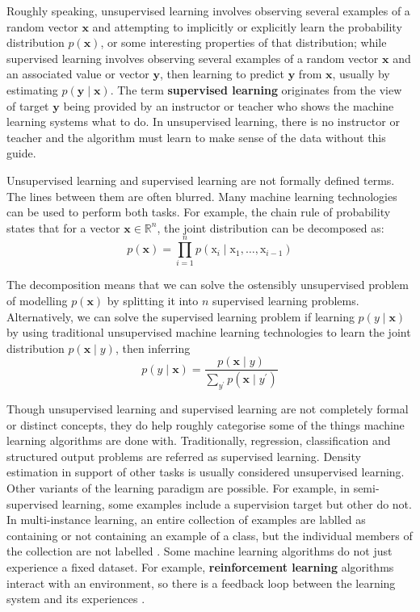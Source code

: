 Roughly speaking, unsupervised learning involves observing several examples of
a random vector $\mathbf{x}$ and attempting to implicitly or explicitly learn
the probability distribution $p(\mathbf{x})$, or some interesting properties of
that distribution; while supervised learning involves observing several
examples of a random vector $\mathbf{x}$ and an associated value or vector
$\mathbf{y}$, then learning to predict $\mathbf{y}$ from $\mathbf{x}$, usually
by estimating $p(\mathbf{y}\mid\mathbf{x})$. The term \textbf{supervised
learning} originates from the view of target $\mathbf{y}$ being provided by an
instructor or teacher who shows the machine learning systems what to do. In
unsupervised learning, there is no instructor or teacher and the algorithm must
learn to make sense of the data without this guide.


Unsupervised learning and supervised learning are not formally defined terms.
The lines between them are often blurred. Many machine learning technologies
can be used to perform both tasks. For example, the chain rule of probability
states that for a vector $\mathbf{x} \in \mathbb{R}^n$, the joint distribution
can be decomposed as:
\begin{equation*}
    p(\mathbf{x}) = \prod_{i=1}^{n}
        p(\mathrm{x}_i \mid \mathrm{x}_1, \dots, \mathrm{x}_{i - 1})
\end{equation*}

The decomposition means that we can solve the ostensibly unsupervised problem
of modelling $p(\mathbf{x})$ by splitting it into $n$ supervised learning
problems. Alternatively, we can solve the supervised learning problem if
learning $p(y \mid \mathbf{x})$ by using traditional unsupervised machine
learning technologies to learn the joint distribution
$p(\mathbf{x} \mid y)$, then inferring
\begin{equation*}
    p(y \mid \mathbf{x}) = \frac{p(\mathbf{x} \mid y)}{\sum_{y^{\prime}}
        p(\mathbf{x} \mid y^{\prime})}
\end{equation*}


Though unsupervised learning and supervised learning are not completely formal
or distinct concepts, they do help roughly categorise some of the things
machine learning algorithms are done with. Traditionally, regression,
classification and structured output problems are referred as supervised
learning. Density estimation in support of other tasks is usually considered
unsupervised learning. Other variants of the learning paradigm are possible.
For example, in semi-supervised learning, some examples include a supervision
target but other do not. In multi-instance learning, an entire collection of
examples are lablled as containing or not containing an example of a class,
but the individual members of the collection are not labelled
\cite{Kotzias:2015:GIL:2783258.2783380}. Some machine learning algorithms do
not just experience a fixed dataset. For example, \textbf{reinforcement
learning} algorithms interact with an environment, so there is a feedback
loop between the learning system and its experiences
\cite{sutton1998reinforcement, bertsekas1996neuro-dynamic}.


